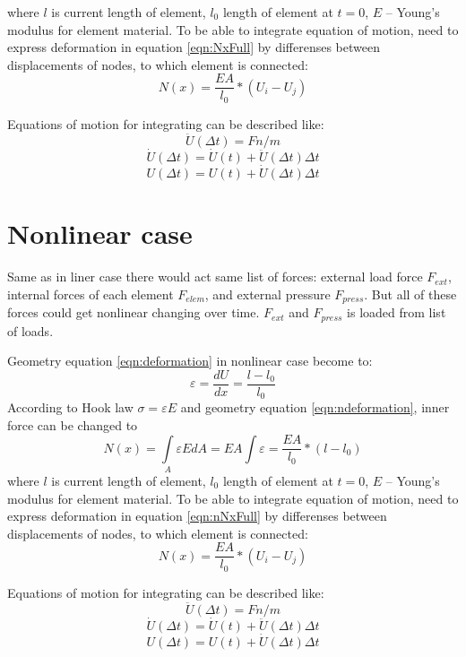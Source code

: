 \documentclass[12pt]{report}
\begin{document}
where $l$ is current length of element, $l_0$ length of element at $t=0$, $E$ – Young’s modulus for element material.
To be able to integrate equation of motion, need to express deformation in equation \eqref{eqn:NxFull} by differenses 
between displacements of nodes, to which element is connected:
\begin{equation}\label{eqn:NxWdispl}
  N(x)=\frac{EA}{l_0}*(U_{i}-U_{j})
\end{equation}\par
Equations of motion for integrating can be described like:
\begin{equation}\label{eqn:Accel}
  \ddot{U}(\Delta t)=Fn/m
\end{equation}
\begin{equation}\label{eqn:Velos}
  \dot{U}(\Delta t)=\dot{U}(t)+\ddot{U}(\Delta t)\Delta t
\end{equation}
\begin{equation}\label{eqn:Displ}
  U(\Delta t)=U(t)+\dot{U}(\Delta t)\Delta t
\end{equation}
\section{Nonlinear case}
Same as in liner case there would act same list of forces: external load force $F_{ext}$,
internal forces of each element $F_{elem}$, and external pressure $F_{press}$. But all 
of these forces could get nonlinear changing over time. $F_{ext}$ and $F_{press}$ is 
loaded from list of loads.
\par
Geometry equation \eqref{eqn:deformation} in nonlinear case become to:
\begin{equation}\label{eqn:ndeformation}
  \varepsilon=\frac{dU}{dx}=\frac{l-l_0}{l_0}
\end{equation}
According to Hook law $\sigma=\varepsilon E$ and geometry equation \eqref{eqn:ndeformation}, inner force can be changed to
\begin{equation}\label{eqn:nNxFull}
  N(x)= \int\limits_A \varepsilon EdA=EA\int \varepsilon=\frac{EA}{l_0}*(l-l_0)
\end{equation}
where $l$ is current length of element, $l_0$ length of element at $t=0$, $E$ – Young’s modulus for element material.
To be able to integrate equation of motion, need to express deformation in equation \eqref{eqn:nNxFull} by differenses 
between displacements of nodes, to which element is connected:
\begin{equation}\label{eqn:nNxWdispl}
  N(x)=\frac{EA}{l_0}*(U_{i}-U_{j})
\end{equation}\par
Equations of motion for integrating can be described like:
\begin{equation}\label{eqn:nAccel}
  \ddot{U}(\Delta t)=Fn/m
\end{equation}
\begin{equation}\label{eqn:nVelos}
  \dot{U}(\Delta t)=\dot{U}(t)+\ddot{U}(\Delta t)\Delta t
\end{equation}
\begin{equation}\label{eqn:nDispl}
  U(\Delta t)=U(t)+\dot{U}(\Delta t)\Delta t
\end{equation}
\end{document}
